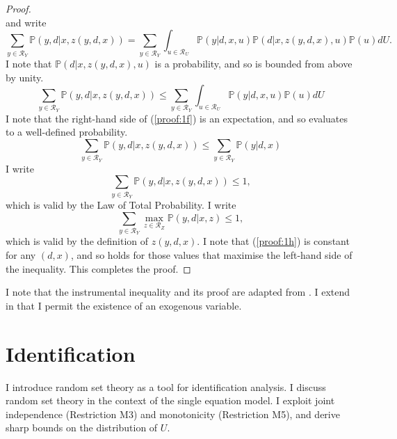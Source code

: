 \documentclass[12pt,a4paper,twoside]{article}
\numberwithin{equation}{section}
\begin{document}
\begin{proof}
\begin{equation}
\end{equation}
and write
\begin{equation}
\sum_{y\in\mathcal{R}_Y}\mathbb{P}(y,d|x,z(y,d,x))=\sum_{y\in\mathcal{R}_Y}\int_{u\in\mathcal{R}_U}\mathbb{P}(y|d,x,u)\mathbb{P}(d|x,z(y,d,x),u)\mathbb{P}(u)dU.\nonumber
\end{equation}
I note that $\mathbb{P}(d|x,z(y,d,x),u)$ is a probability, and so is bounded from above by unity.   
\begin{equation}
\sum_{y\in\mathcal{R}_Y}\mathbb{P}(y,d|x,z(y,d,x))\leq \sum_{y\in\mathcal{R}_Y}\int_{u\in\mathcal{R}_U}\mathbb{P}(y|d,x,u)\mathbb{P}(u)dU\label{proof:1f}
\end{equation}
I note that the right-hand side of (\ref{proof:1f}) is an expectation, and so evaluates to a well-defined probability.
\begin{equation}
\sum_{y\in\mathcal{R}_Y}\mathbb{P}(y,d|x,z(y,d,x))\leq \sum_{y\in\mathcal{R}_Y}\mathbb{P}(y|d,x)\label{proof:1g}
\end{equation}
I write
\begin{equation}
\sum_{y\in\mathcal{R}_Y}\mathbb{P}(y,d|x,z(y,d,x))\leq 1,\nonumber
\end{equation}
which is valid by the Law of Total Probability. I write 
\begin{equation}
\sum_{y\in\mathcal{R}_Y}\max_{z\in\mathcal{R}_Z}\mathbb{P}(y,d|x,z)\leq 1,\label{proof:1h}
\end{equation}
which is valid by the definition of $z(y,d,x)$. I note that (\ref{proof:1h}) is constant for any $(d,x)$, and so holds for those values that maximise the left-hand side of the inequality. This completes the proof.
\end{proof} 
\vspace{20pt} 
\noindent I note that the instrumental inequality and its proof are adapted from \cite{p95b}. I extend \cite{p95b} in that I permit the existence of an exogenous variable. 
\section{Identification}
I introduce random set theory \citep{book.molchanov} as a tool for identification analysis. I discuss random set theory in the context of the single equation model. I exploit joint independence (Restriction M3) and monotonicity (Restriction M5), and derive sharp bounds on the distribution of $U$.
\end{document}
